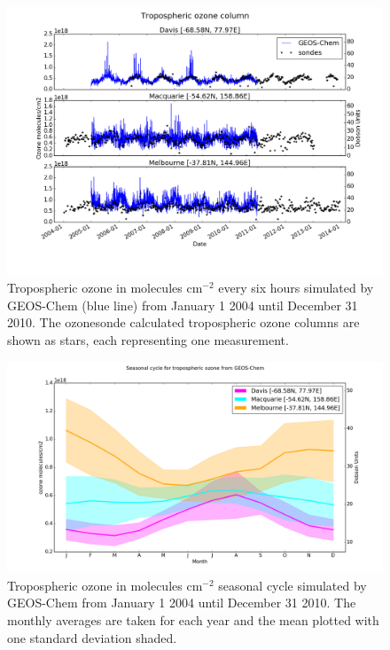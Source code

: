     \begin{figure}[!htbp]
      \includegraphics[width=\textwidth]{Figures/Ozone/StationSeries.png}
      \caption{Tropospheric ozone in molecules cm$^{-2}$ every six hours simulated by GEOS-Chem (blue line) from January 1 2004 until December 31 2010. The ozonesonde calculated tropospheric ozone columns are shown as stars, each representing one measurement. }
      \label{ch_o3:fig:StationSeriesGEOSChem}
    \end{figure}
    
    \begin{figure}[!htbp]
      \includegraphics[width=\textwidth]{Figures/Ozone/Yearly_cycle.png}
      \caption{Tropospheric ozone in molecules cm$^{-2}$ seasonal cycle simulated by GEOS-Chem from January 1 2004 until December 31 2010. The monthly averages are taken for each year and the mean plotted with one standard deviation shaded.}
      \label{ch_o3:fig:YearlyCyclGEOSChem}
    \end{figure}
    
